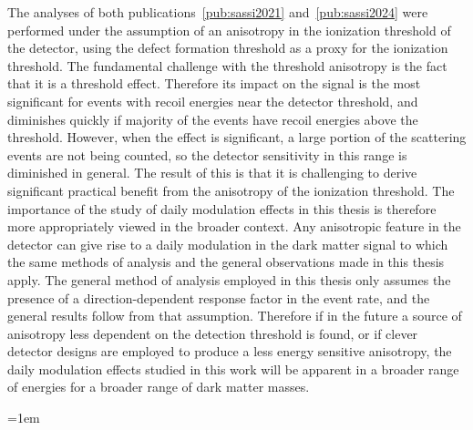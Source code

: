 \documentclass[b5paper, 10pt, twoside]{book}
\begin{document}
The analyses of both publications~\ref{pub:sassi2021} and~\ref{pub:sassi2024} were performed under the assumption of an anisotropy in the ionization threshold of the detector, using the defect formation threshold as a proxy for the ionization threshold. The fundamental challenge with the threshold anisotropy is the fact that it is a threshold effect. Therefore its impact on the signal is the most significant for events with recoil energies near the detector threshold, and diminishes quickly if majority of the events have recoil energies above the threshold. However, when the effect is significant, a large portion of the scattering events are not being counted, so the detector sensitivity in this range is diminished in general. The result of this is that it is challenging to derive significant practical benefit from the anisotropy of the ionization threshold. The importance of the study of daily modulation effects in this thesis is therefore more appropriately viewed in the broader context. Any anisotropic feature in the detector can give rise to a daily modulation in the dark matter signal to which the same methods of analysis and the general observations made in this thesis apply. The general method of analysis employed in this thesis only assumes the presence of a direction-dependent response factor in the event rate, and the general results follow from that assumption. Therefore if in the future a source of anisotropy less dependent on the detection threshold is found, or if clever detector designs are employed to produce a less energy sensitive anisotropy, the daily modulation effects studied in this work will be apparent in a broader range of energies for a broader range of dark matter masses.

\backmatter

\emergencystretch=1em
\printbibliography[heading = bibintoc, title = References]
\end{document}
